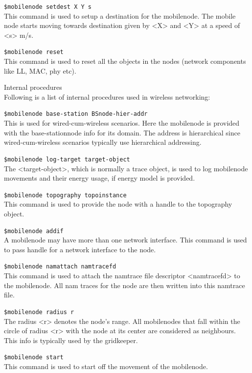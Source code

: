 \begin{flushleft}
{\tt \$mobilenode setdest \<X\> \<Y\> \<s\>}\\
This command is used to setup a destination for the mobilenode. The mobile
node starts moving towards destination given by <X> and <Y> at a speed of
<s> m/s.


{\tt \$mobilenode reset}\\
This command is used to reset all the objects in the nodes (network 
components like LL, MAC, phy etc).


Internal procedures\\
Following is a list of internal procedures used in wireless networking:

{\tt \$mobilenode base-station \<BSnode-hier-addr\>}\\
This is used for wired-cum-wireless scenarios. Here the mobilenode is provided
with the base-stationnode info for its domain. The address is hierarchical
since wired-cum-wireless scenarios typically use hierarchical addressing.


{\tt \$mobilenode log-target  \<target-object\>}\\
The <target-object>, which is normally a trace object, is used to log
mobilenode movements and their energy usage, if energy model is provided.


{\tt \$mobilenode topography \<topoinstance\>}\\
This command is used to provide the node with a handle to the topography
object.


{\tt \$mobilenode addif}\\
A mobilenode may have more than one network interface. This command is used
to pass handle for a network interface to the node.


{\tt \$mobilenode  namattach \<namtracefd\>}\\
This command is used to attach the namtrace file descriptor <namtracefd>
to the mobilenode. All nam traces for the node are then written into this
namtrace file.


{\tt \$mobilenode radius \<r\>}\\
The radius <r> denotes the node's range. All mobilenodes that fall within
the circle of radius <r> with the node at its center are considered as
neighbours. This info is typically used by the gridkeeper.


{\tt \$mobilenode start}\\
This command is used to start off the movement of the mobilenode.

\end{flushleft}

\endinput


